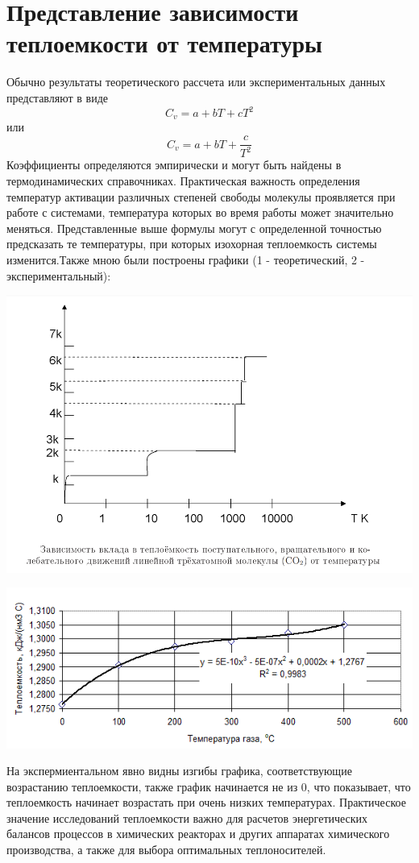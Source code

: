 \documentclass{article}
\begin{document}
\section{Представление зависимости теплоемкости от температуры}
Обычно результаты теоретического рассчета или экспериментальных данных представляют в виде
\begin{equation*}
C_v = a+bT+cT^2
\end{equation*}
или
\begin{equation*}
C_v = a+bT+\frac{c}{T^2}
\end{equation*}
Коэффициенты определяются эмпирически и могут быть найдены в термодинамических справочниках.
Практическая важность определения температур активации различных степеней свободы молекулы проявляется при работе с системами, температура которых во время работы может значительно меняться. Представленные выше формулы могут с определенной точностью предсказать те температуры, при которых изохорная теплоемкость системы изменится.Также мною были построены графики (1 - теоретический, 2 - экспериментальный):
         \begin{center}
  \includegraphics[width=0.8\linewidth]{ooh.png}\\
 \end{center}
          \begin{center}
  \includegraphics[width=0.8\linewidth]{hoo.png}\\
 \end{center}
 На экспермиентальном явно видны изгибы графика, соответствующие возрастанию теплоемкости, также график начинается не из 0, что показывает, что теплоемкость начинает возрастать при очень низких температурах. Практическое значение исследований теплоемкости важно для расчетов энергетических балансов процессов в химических реакторах и других аппаратах химического производства, а также для выбора оптимальных теплоносителей. 
\end{document}
